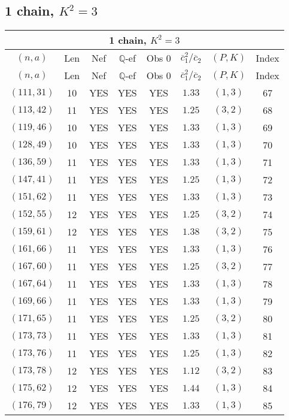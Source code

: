 \subsection{1 chain, $K^2 = 3$}
\begin{longtable}{|c|c|c|c|c|c|c|c|}
\hline
\multicolumn{8}{|c|}{1 chain, $K^2 = 3$}\\
\hline
$(n,a)$ & Len & Nef & $\mathbb Q$-ef & Obs 0 & $\overline c_1^2 / \overline c_2$ & $(P,K)$ & Index\\
\hline
\endfirsthead

\hline
$(n,a)$ & Len & Nef & $\mathbb Q$-ef & Obs 0 & $\overline c_1^2 / \overline c_2$ & $(P,K)$ & Index\\
\hline
\endhead
\hline
\endfoot

$(111,31)$ & 10 & YES & YES & YES & $1.33$ & $(1,3)$ & 67\\
$(113,42)$ & 11 & YES & YES & YES & $1.25$ & $(3,2)$ & 68\\
$(119,46)$ & 10 & YES & YES & YES & $1.33$ & $(1,3)$ & 69\\
$(128,49)$ & 10 & YES & YES & YES & $1.33$ & $(1,3)$ & 70\\
$(136,59)$ & 11 & YES & YES & YES & $1.33$ & $(1,3)$ & 71\\
$(147,41)$ & 11 & YES & YES & YES & $1.25$ & $(1,3)$ & 72\\
$(151,62)$ & 11 & YES & YES & YES & $1.33$ & $(1,3)$ & 73\\
$(152,55)$ & 12 & YES & YES & YES & $1.25$ & $(3,2)$ & 74\\
$(159,61)$ & 12 & YES & YES & YES & $1.38$ & $(3,2)$ & 75\\
$(161,66)$ & 11 & YES & YES & YES & $1.33$ & $(1,3)$ & 76\\
$(167,60)$ & 11 & YES & YES & YES & $1.25$ & $(3,2)$ & 77\\
$(167,64)$ & 11 & YES & YES & YES & $1.33$ & $(1,3)$ & 78\\
$(169,66)$ & 11 & YES & YES & YES & $1.33$ & $(1,3)$ & 79\\
$(171,65)$ & 11 & YES & YES & YES & $1.25$ & $(3,2)$ & 80\\
$(173,73)$ & 11 & YES & YES & YES & $1.33$ & $(1,3)$ & 81\\
$(173,76)$ & 11 & YES & YES & YES & $1.25$ & $(1,3)$ & 82\\
$(173,78)$ & 12 & YES & YES & YES & $1.12$ & $(3,2)$ & 83\\
$(175,62)$ & 12 & YES & YES & YES & $1.44$ & $(1,3)$ & 84\\
$(176,79)$ & 12 & YES & YES & YES & $1.33$ & $(1,3)$ & 85\\

\end{longtable}
